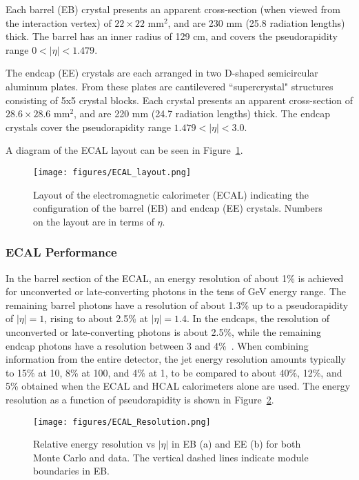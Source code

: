 Each barrel (EB) crystal presents an apparent cross-section (when viewed from the interaction vertex) of $22\times22$  mm$^2$, and are 230 mm (25.8 radiation lengths) thick. The barrel has an inner radius of 129 cm, and covers the pseudorapidity range $0 < |\eta| < 1.479$.\cite{TDR}

The endcap (EE) crystals are each arranged in two D-shaped semicircular aluminum plates. From these plates are cantilevered ``supercrystal" structures consisting of 5x5 crystal blocks. Each crystal presents an apparent cross-section of $28.6\times28.6$ mm$^2$, and are 220 mm (24.7 radiation lengths) thick. The endcap crystals cover the pseudorapidity range $1.479 < |\eta| < 3.0$.\cite{ECAL}

A diagram of the ECAL layout can be seen in Figure~\ref{fig:ECAL_layout}.

\begin{figure}\centering
  \texttt{[image: figures/ECAL\_layout.png]}
  \caption{\label{fig:ECAL_layout} Layout of the electromagnetic calorimeter (ECAL) indicating the configuration of the barrel (EB) and endcap (EE) crystals. Numbers on the layout are in terms of $\eta$.}
\end{figure}

\subsubsection{ECAL Performance}

In the barrel section of the ECAL, an energy resolution of about 1\% is achieved for unconverted or late-converting photons in the tens of GeV energy range. The remaining barrel photons have a resolution of about 1.3\% up to a pseudorapidity of $|\eta| = 1$, rising to about 2.5\% at $|\eta| = 1.4$. In the endcaps, the resolution of unconverted or late-converting photons is about 2.5\%, while the remaining endcap photons have a resolution between 3 and 4\%~\cite{CMS:EGM-14-001}. When combining information from the entire detector, the jet energy resolution amounts typically to 15\% at 10\GeV, 8\% at 100\GeV, and 4\% at 1\TeV, to be compared to about 40\%, 12\%, and 5\% obtained when the ECAL and HCAL calorimeters alone are used. The energy resolution as a function of pseudorapidity is shown in Figure~\ref{fig:ECAL_Resolution}. \cite{ECAL}

\begin{figure}\centering
  \texttt{[image: figures/ECAL\_Resolution.png]}
  \caption{\label{fig:ECAL_Resolution} Relative energy resolution vs $|\eta|$ in EB (a) and EE (b) for both Monte Carlo and data. The vertical dashed lines indicate module boundaries in EB.}
\end{figure}





